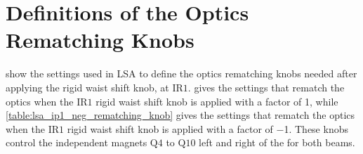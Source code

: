 
\section{Definitions of the Optics Rematching Knobs}

 show the settings used in LSA to define the optics rematching knobs needed after applying the rigid waist shift knob, at \(\mathrm{IR1}\).
 gives the settings that rematch the optics when the \(\mathrm{IR1}\) rigid waist shift knob is applied with a factor of \num{1}, while \cref{table:lsa_ip1_neg_rematching_knob} gives the settings that rematch the optics when the \(\mathrm{IR1}\) rigid waist shift knob is applied with a factor of \num{-1}.
These knobs control the independent magnets \(\mathrm{Q4}\) to \(\mathrm{Q10}\) left and right of the \IP for both beams.

